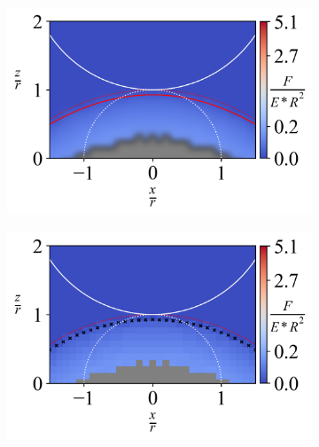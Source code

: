 \begin{figure}[H]
    
    \begin{subfigure}{0.32\textwidth}
        \centering
        \caption{\label{fig: All-Hemisphere-ContourPlot-9}}
        \includegraphics[width=1\linewidth]{Figures/Hemisphere-ContourPlot-9.png}
    \end{subfigure}  
    \hfill
        \begin{subfigure}{0.32\textwidth}
        \centering
        \caption{\label{fig: All-Hemisphere-ContourPlotNI-9}}
        \includegraphics[width=1\linewidth]{Figures/Hemisphere-ContourPlotNI-9.png}
    \end{subfigure}
    \hfill
    \begin{subfigure}{0.32\textwidth}
        \centering
        \caption{\label{fig: All-Hemisphere-LineContour-9}}

\end{subfigure}
\end{figure}
